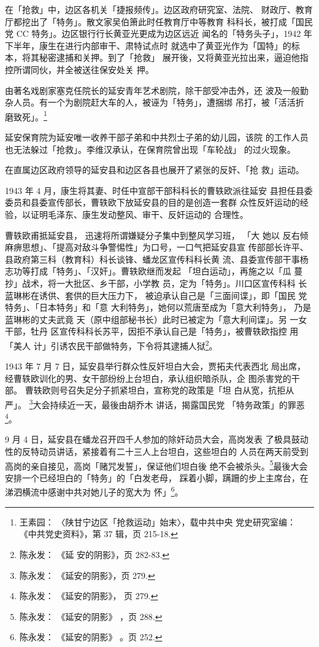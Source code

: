在「抢救」中，边区各机关「捷报频传」。边区政府研究室、法院、
财政厅、教育厅都挖出了「特务」。散文家吴伯箫此时任教育厅中等教育
科科长，被打成「国民党 CC 特务」。边区银行行长黄亚光更成为边区远近
闻名的「特务头子」，1942 年下半年，康生在进行内部审干、肃特试点时
就选中了黄亚光作为「国特」的标本，将其秘密逮捕和关押。到了「抢救」
展开後，又将黄亚光拉出来，逼迫他指控所谓同伙，并全被送往保安处关
押。

由著名戏剧家塞克任院长的延安青年艺术剧院，除干部受冲击外，还 波及一般勤
杂人员。有一个为剧院赶大车的人，被诬为「特务」，遭捆绑 吊打，被「活活折
磨致死」。\footnote{王素园： 〈陕甘宁边区「抢救运动」始末〉，载中共中央
党史研究室编： 《中共党史资料》，第 37 辑，页 215-18.} 

延安保育院为延安唯一收养干部子弟和中共烈士子弟的幼儿园，该院
的工作人员也无法躲过「抢救」。李维汉承认，在保育院曾出现「车轮战」
的过火现象。

在直属边区政府领导的延安县和边区各县也展开了紧张的反奸、「抢
救」运动。

1943 年 4 月，康生将其妻、时任中宣部干部科科长的曹轶欧派往延安
县担任县委委员和县委宣传部长，曹轶欧下放延安县的目的是创造一套群
众性反奸运动的经验，以证明毛泽东、康生发动整风、审干、反奸运动的
合理性。

曹轶欧甫抵延安县， 迅速将所谓嫌疑分子集中到整风学习班， 「大 她以 反右倾
麻痹思想」、「提高对敌斗争警惕性」为口号，一口气把延安县宣 传部部长许平、
县政府第三科（教育科）科长谈锋、蟠龙区宣传科科长黄 流、县委宣传部干事杨
志功等打成「特务」、「汉奸」。曹轶欧继而发起 「坦白运动」，再施之以「瓜
蔓抄」战术，将一大批区、乡干部，小学教 员，定为「特务」。川口区宣传科科
长蓝琳彬在诱供、套供的巨大压力下， 被迫承认自己是「三面间谍」，即「国民
党特务」、「日本特务」和「意 大利特务」，她何以荒唐至成为「意大利特务」，
乃是蓝琳彬的丈夫武竟 天（原中组部秘书长）此时已被定为「意大利间谍」。另
一女干部，牡丹 区宣传科科长苏平，因拒不承认自己是「特务」，被曹轶欧指控
用「美人 计」引诱农民干部做特务，下令将其逮捕人狱\footnote{陈永发： 《延
安的阴影》，页 282-83.}。

1943 年 7 月 7 日，延安县举行群众性反奸坦白大会，贾拓夫代表西北 局出席，
经曹轶欧训化的男、女干部纷纷上台坦白，承认组织暗杀队，企 图杀害党的干部。
曹轶欧则号召失足分子抓紧坦白，宣称党的政策是「坦 白从宽，抗拒从严」。
\footnote{陈永发： 《延安的阴影》，页 279.}大会持续近一天，最後由胡乔木
讲话，揭露国民党 「特务政策」的罪恶\footnote{陈永发： 《延安的阴影》，
页 279.}。

9 月 4 日，延安县在蟠龙召开四千人参加的除奸动员大会，高岗发表
了极具鼓动性的反特动员讲话，紧接着有二十三人上台坦白，这些坦白的
人员在两天前受到高岗的亲自接见，高岗「赌咒发誓」，保证他们坦白後
绝不会被杀头。\footnote{陈永发：
《延安的阴影》
，页 288.}最後大会安排一个已经坦白的「特务」的「白发老母，
踩着小脚，蹒跚的步上主席台，在涕泗横流中感谢中共对她儿子的宽大为
怀」\footnote{陈永发：
《延安的阴影》
。页 252.}。

